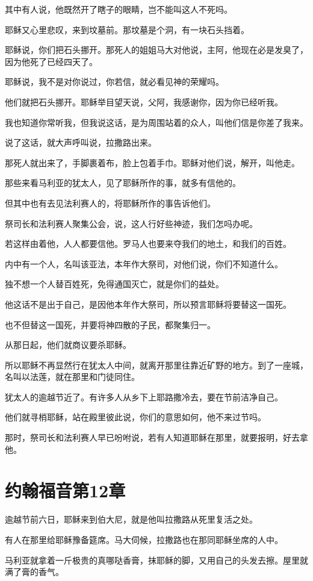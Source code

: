 \documentclass[12pt,oneside]{book}
\begin{document}
其中有人说，他既然开了瞎子的眼睛，岂不能叫这人不死吗。

耶稣又心里悲叹，来到坟墓前。那坟墓是个洞，有一块石头挡着。

耶稣说，你们把石头挪开。那死人的姐姐马大对他说，主阿，他现在必是发臭了，因为他死了已经四天了。

耶稣说，我不是对你说过，你若信，就必看见神的荣耀吗。

他们就把石头挪开。耶稣举目望天说，父阿，我感谢你，因为你已经听我。

我也知道你常听我，但我说这话，是为周围站着的众人，叫他们信是你差了我来。

说了这话，就大声呼叫说，拉撒路出来。

那死人就出来了，手脚裹着布，脸上包着手巾。耶稣对他们说，解开，叫他走。

那些来看马利亚的犹太人，见了耶稣所作的事，就多有信他的。

但其中也有去见法利赛人的，将耶稣所作的事告诉他们。

祭司长和法利赛人聚集公会，说，这人行好些神迹，我们怎吗办呢。

若这样由着他，人人都要信他。罗马人也要来夺我们的地土，和我们的百姓。

内中有一个人，名叫该亚法，本年作大祭司，对他们说，你们不知道什么。

独不想一个人替百姓死，免得通国灭亡，就是你们的益处。

他这话不是出于自己，是因他本年作大祭司，所以预言耶稣将要替这一国死。

也不但替这一国死，并要将神四散的子民，都聚集归一。

从那日起，他们就商议要杀耶稣。

所以耶稣不再显然行在犹太人中间，就离开那里往靠近矿野的地方。到了一座城，名叫以法莲，就在那里和门徒同住。

犹太人的逾越节近了。有许多人从乡下上耶路撒冷去，要在节前洁净自己。

他们就寻梢耶稣，站在殿里彼此说，你们的意思如何，他不来过节吗。

那时，祭司长和法利赛人早已吩咐说，若有人知道耶稣在那里，就要报明，好去拿他。

\chapter{约翰福音第12章}
逾越节前六日，耶稣来到伯大尼，就是他叫拉撒路从死里复活之处。

有人在那里给耶稣豫备筵席。马大伺候，拉撒路也在那同耶稣坐席的人中。

马利亚就拿着一斤极贵的真哪哒香膏，抹耶稣的脚，又用自己的头发去擦。屋里就满了膏的香气。
\end{document}
